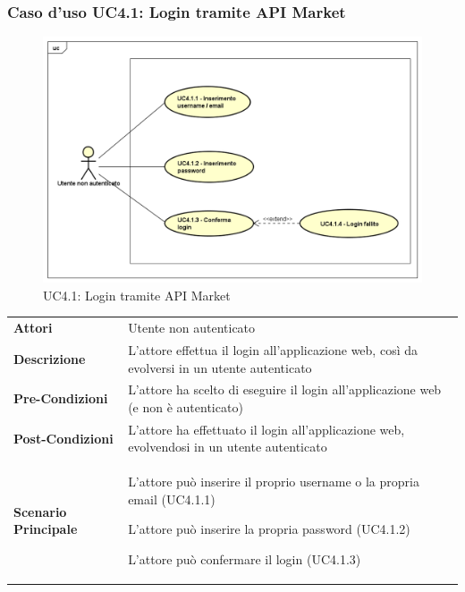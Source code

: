 \newpage
\subsubsection{Caso d'uso UC4.1: Login tramite API Market}
\label{UC4_1}
\begin{figure}[!htbp]
	\centering
	\includegraphics[scale=0.45]{UML/UC4_1.png}
	\caption{UC4.1: Login tramite API Market}
\end{figure}

\begin{tabular}{ l | p{11cm}}
	\hline
	\rowcolor{Gray}
	 \multicolumn{2}{c}{UC4.1 - Login tramite API Market} \\
	 \hline
	\textbf{Attori} & Utente non autenticato \\
	\textbf{Descrizione} & L'attore effettua il login all'applicazione web, così da evolversi in un utente autenticato\\
	\textbf{Pre-Condizioni} & L'attore ha scelto di eseguire il login all'applicazione web (e non è autenticato) \\
	\textbf{Post-Condizioni} & L'attore ha effettuato il login all'applicazione web, evolvendosi in un utente autenticato \\
	\textbf{Scenario Principale} & 
	\begin{enumerate*}[label=(\arabic*.),itemjoin={\newline}]
		\item L'attore può inserire il proprio username o la propria email (UC4.1.1)
		\item L'attore può inserire la propria password (UC4.1.2)
		\item L'attore può confermare il login (UC4.1.3)
	\end{enumerate*}\\
\end{tabular}


